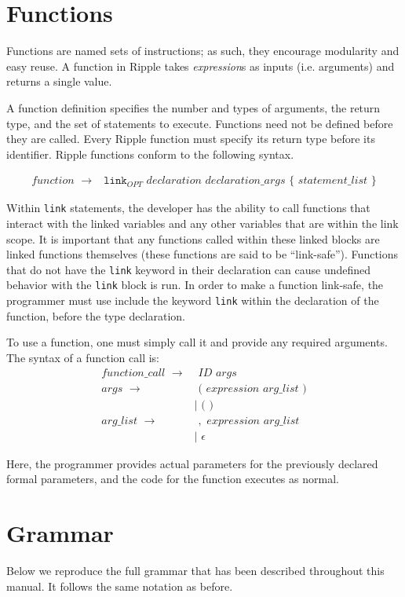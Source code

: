 \documentclass{article}
\newcommand{\code}{\texttt}
\begin{document}
\section{Functions}
Functions are named sets of instructions; as such, they encourage modularity and easy reuse. A function in Ripple takes \emph{expression}s as inputs (i.e. arguments) and returns a single value.

A function definition specifies the number and types of arguments, the return type, and the set of statements to execute. Functions need not be defined before they are called. Every Ripple function must specify its return type before its identifier. Ripple functions conform to the following syntax.

\begin{align*}
function\,\,\rightarrow& \code{link}_{OPT}\,\,declaration\,\,declaration\_args\,\,\code{\{}\,\,statement\_list\,\,\code{\}}
\end{align*}

Within \code{link} statements, the developer has the ability to call functions that interact with the linked variables and any other variables that are within the link scope. It is important that any functions called within these linked blocks are linked functions themselves (these functions are said to be ``link-safe''). Functions that do not have the \code{link} keyword in their declaration can cause undefined behavior with the \code{link} block is run. In order to make a function link-safe, the programmer must use include the keyword \code{link} within the declaration of the function, before the type declaration.


To use a function, one must simply call it and provide any required arguments. The syntax of a function call is:
\begin{align*}
function\_call\,\,\rightarrow&\,\,ID\,\,args\\
args\,\,\rightarrow&\,\,\code{(}\,\,expression\,\,arg\_list\,\,\code{)}\\
                    & |\,\,\code{(}\,\,\code{)}\\
arg\_list\,\,\rightarrow&\,\,,\,\,expression\,\,arg\_list\\
                    & |\,\,\epsilon
\end{align*}

Here, the programmer provides actual parameters for the previously declared formal parameters, and the code for the function executes as normal.

\section{Grammar}
Below we reproduce the full grammar that has been described throughout this manual. It follows the same notation as before.
\end{document}
